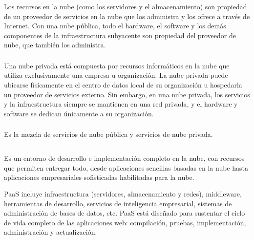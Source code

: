 \documentclass[10pt,a4paper]{article} %
\begin{document}
	\subsubsection{}
	{\large Los recursos en la nube (como los servidores y el almacenamiento) son propiedad de un proveedor de servicios en la nube que los administra y los ofrece a trav{\'e}s de Internet. Con una nube p{\'u}blica, todo el hardware, el software y los dem{\'a}s componentes de la infraestructura subyacente son propiedad del proveedor de nube, que tambi{\'e}n los administra. }
	
	\subsubsection{\color{colorESCOM}{Nubes privadas:}}
	{\large Una nube privada est{\'a} compuesta por recursos inform{\'a}ticos en la nube que utiliza exclusivamente una empresa u organizaci{\'o}n. La nube privada puede ubicarse f{\'i}sicamente en el centro de datos local de su organizaci{\'o}n u hospedarla un proveedor de servicios externo. Sin embargo, en una nube privada, los servicios y la infraestructura siempre se mantienen en una red privada, y el hardware y software se dedican {\'u}nicamente a su organizaci{\'o}n. }
	
	\subsubsection{\color{colorESCOM}{Nubes hibridas:}}
	{\large Es la mezcla de servicios de nube p{\'u}blica y servicios de nube privada. 
		
		
		\vspace{0.5cm}}
	
	
	\subsection{ \color{colorESCOM}{Plataforma como Servicio (PAAS):}}
	{\large Es un entorno de desarrollo e implementaci{\'o}n completo en la nube, con recursos que permiten entregar todo, desde aplicaciones sencillas basadas en la nube hasta aplicaciones empresariales sofisticadas habilitadas para la nube.
		
		
		\vspace{0.5cm}
		PaaS incluye infraestructura (servidores, almacenamiento y redes), middleware, herramientas de desarrollo, servicios de inteligencia empresarial, sistemas de administraci{\'o}n de bases de datos, etc. PaaS est{\'a} dise{\~n}ado para sustentar el ciclo de vida completo de las aplicaciones web: compilaci{\'o}n, pruebas, implementaci{\'o}n, administraci{\'o}n y actualizaci{\'o}n.}
	
\end{document}
